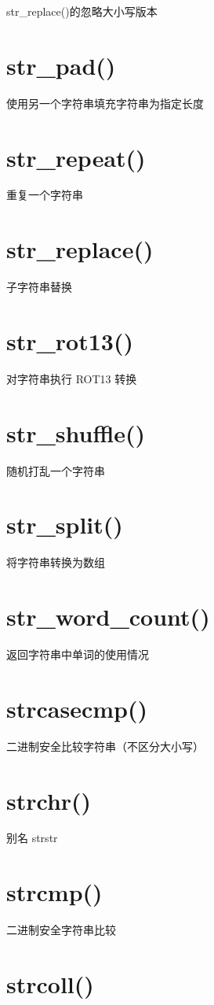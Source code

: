 str\_replace()的忽略大小写版本
\section{str\_pad()}

使用另一个字符串填充字符串为指定长度
\section{str\_repeat()}

重复一个字符串
\section{str\_replace()}

子字符串替换
\section{str\_rot13()}

对字符串执行 ROT13 转换
\section{str\_shuffle()}

随机打乱一个字符串
\section{str\_split()}
将字符串转换为数组

\section{str\_word\_count()}


返回字符串中单词的使用情况
\section{strcasecmp()}

二进制安全比较字符串（不区分大小写）
\section{strchr()}

别名 strstr
\section{strcmp()}

二进制安全字符串比较
\section{strcoll()}

